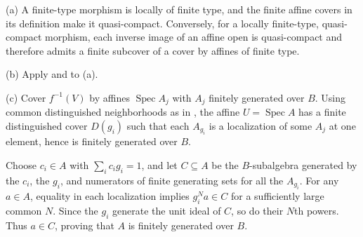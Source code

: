 (a) A finite-type morphism is locally of finite type, and the finite affine covers in its definition make it quasi-compact. Conversely, for a locally finite-type, quasi-compact morphism, each inverse image of an affine open is quasi-compact and therefore admits a finite subcover of a cover by affines of finite type.

(b) Apply  and  to (a).

(c) Cover $f^{-1}(V)$ by affines $\operatorname{Spec}A_j$ with $A_j$ finitely generated over $B$. Using common distinguished neighborhoods as in , the affine $U=\operatorname{Spec}A$ has a finite distinguished cover $D(g_i)$ such that each $A_{g_i}$ is a localization of some $A_j$ at one element, hence is finitely generated over $B$.

Choose $c_i\in A$ with $\sum_i c_ig_i=1$, and let $C\subseteq A$ be the $B$-subalgebra generated by the $c_i$, the $g_i$, and numerators of finite generating sets for all the $A_{g_i}$. For any $a\in A$, equality in each localization implies $g_i^Na\in C$ for a sufficiently large common $N$. Since the $g_i$ generate the unit ideal of $C$, so do their $N$th powers. Thus $a\in C$, proving that $A$ is finitely generated over $B$.
